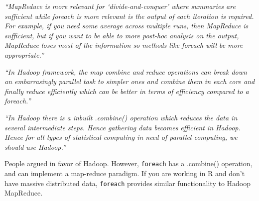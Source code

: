 \documentclass[12pt]{beamer}
\newcommand\ans[1]{{\it ``#1''}}
\newcommand\gap{\vspace{5mm}}
\begin{document}
\begin{frame}
  \ans{MapReduce is more relevant for `divide-and-conquer' where summaries are sufficient while foreach is more relevant is the output of each iteration is required. For example, if you need some average across multiple runs, then MapReduce is sufficient, but if you want to be able to more post-hoc analysis on the output, MapReduce loses most of the information so methods like foreach will be more appropriate.}
  
\end{frame}

\begin{frame}
  \ans{In  Hadoop  framework,  the  map  combine  and  reduce  operations  can  break  down  an embarrasingly parallel task to simpler ones and combine them in each core and finally reduce efficiently which can be better in terms of efficiency compared to a foreach.}

  \gap
  
\ans{In Hadoop there is a inbuilt .combine() operation which reduces the data in several intermediate steps.  Hence gathering data becomes efficient in Hadoop. Hence for all types of statistical computing in need of parallel computing, we should use Hadoop.}
  
\end{frame}

\begin{frame}

  People argued in favor of Hadoop. However, \texttt{foreach} has a .combine() operation, and can implement a map-reduce paradigm. If you are working in R and don't have massive distributed data, \texttt{foreach} provides similar functionality to Hadoop MapReduce.

\end{frame}

  
\end{document}
